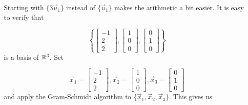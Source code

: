 \documentclass{ximera}
\begin{document}
\begin{example}
\begin{explanation}
Starting with $\{ 3\vec{u}_1 \}$ instead of $\{ \vec{u}_1 \}$ makes the
arithmetic a bit easier.
It is easy to verify that
 
\[ \left\{ \left[\begin{array}{r} -1 \\ 2 \\ 2 \end{array}\right],
\left[\begin{array}{r} 1 \\ 0 \\ 0 \end{array}\right],
\left[\begin{array}{r} 0 \\ 1 \\ 0 \end{array}\right]\right\}\]
is a basis of $\mathbb{R}^3$.  Set
 
\[ \vec{x}_1 = \left[\begin{array}{r} -1 \\ 2 \\ 2 \end{array}\right],
\vec{x}_2 = \left[\begin{array}{r} 1 \\ 0 \\ 0 \end{array}\right],
\vec{x}_3 =\left[\begin{array}{r} 0 \\ 1 \\ 0 \end{array}\right]\]
and apply the Gram-Schmidt algorithm to
$\{ \vec{x}_1, \vec{x}_2, \vec{x}_3\}$. This gives us
 

\end{explanation}
\end{example}
\end{document}
